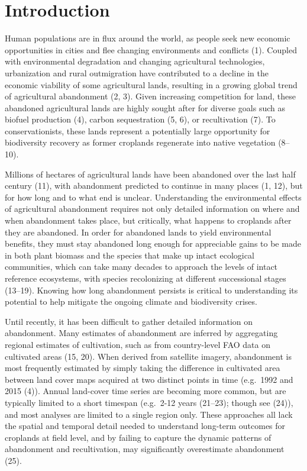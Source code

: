 \documentclass[9pt,twocolumn,twoside,]{pnas-new}
\begin{document}
\hypertarget{introduction}{%
\section{Introduction}\label{introduction}}

Human populations are in flux around the world, as people seek new
economic opportunities in cities and flee changing environments and
conflicts (1). Coupled with environmental degradation and changing
agricultural technologies, urbanization and rural outmigration have
contributed to a decline in the economic viability of some agricultural
lands, resulting in a growing global trend of agricultural abandonment
(2, 3). Given increasing competition for land, these abandoned
agricultural lands are highly sought after for diverse goals such as
biofuel production (4), carbon sequestration (5, 6), or recultivation
(7). To conservationists, these lands represent a potentially large
opportunity for biodiversity recovery as former croplands regenerate
into native vegetation (8--10).

Millions of hectares of agricultural lands have been abandoned over the
last half century (11), with abandonment predicted to continue in many
places (1, 12), but for how long and to what end is unclear.
Understanding the environmental effects of agricultural abandonment
requires not only detailed information on where and when abandonment
takes place, but critically, what happens to croplands after they are
abandoned. In order for abandoned lands to yield environmental benefits,
they must stay abandoned long enough for appreciable gains to be made in
both plant biomass and the species that make up intact ecological
communities, which can take many decades to approach the levels of
intact reference ecosystems, with species recolonizing at different
successional stages (13--19). Knowing how long abandonment persists is
critical to understanding its potential to help mitigate the ongoing
climate and biodiversity crises.

Until recently, it has been difficult to gather detailed information on
abandonment. Many estimates of abandonment are inferred by aggregating
regional estimates of cultivation, such as from country-level FAO data
on cultivated areas (15, 20). When derived from satellite imagery,
abandonment is most frequently estimated by simply taking the difference
in cultivated area between land cover maps acquired at two distinct
points in time (e.g.~1992 and 2015 (4)). Annual land-cover time series
are becoming more common, but are typically limited to a short timespan
(e.g.~2-12 years (21--23); though see (24)), and most analyses are
limited to a single region only. These approaches all lack the spatial
and temporal detail needed to understand long-term outcomes for
croplands at field level, and by failing to capture the dynamic patterns
of abandonment and recultivation, may significantly overestimate
abandonment (25).
\end{document}
